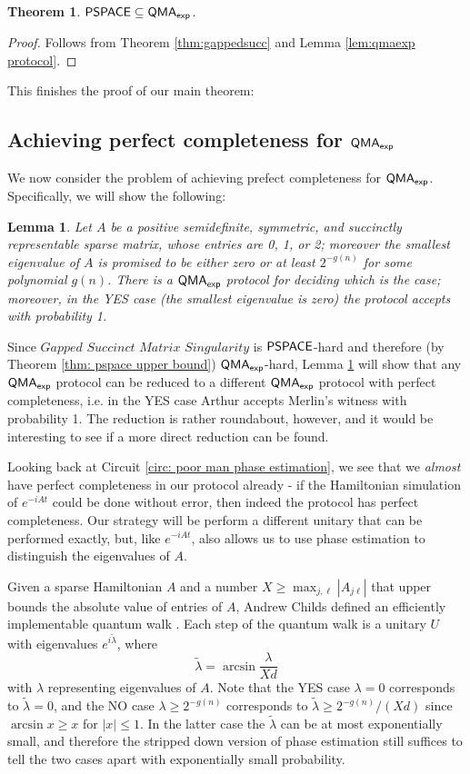 \documentclass[11pt]{article}
\newtheorem{theorem}{Theorem}
\newtheorem{lemma}{Lemma}
\theoremstyle{definition}
\theoremstyle{remark}
\newcommand\PSPACE{{\sf{PSPACE}}}
\newcommand\QMAexp{{\sf{QMA}_{exp}}}
\newcommand\gappedsucc{\textit{Gapped Succinct Matrix Singularity}}
\begin{document}
\begin{theorem}
$\PSPACE\subseteq\QMAexp$.
\end{theorem}
\begin{proof}
Follows from Theorem \ref{thm:gappedsucc} and Lemma \ref{lem:qmaexp protocol}.
\end{proof}
This finishes the proof of our main theorem:
\thmmain*
\subsection{Achieving perfect completeness for $\QMAexp$}
We now consider the problem of achieving prefect completeness for $\QMAexp$. Specifically, we will show the following:
\begin{lemma} \label{lem:qmaexp perfect completeness}
Let $A$ be a positive semidefinite, symmetric, and succinctly representable sparse matrix, whose entries are 0, 1, or 2; moreover the smallest eigenvalue of $A$ is promised to be either zero or at least $2^{-g(n)}$ for some polynomial $g(n)$. There is a $\QMAexp$ protocol for deciding which is the case; moreover, in the YES case (the smallest eigenvalue is zero) the protocol accepts with probability 1.
\end{lemma}
 Since $\gappedsucc$ is $\PSPACE$-hard and therefore (by Theorem \ref{thm: pspace upper bound}) $\QMAexp$-hard, Lemma \ref{lem:qmaexp perfect completeness} will show that any $\QMAexp$ protocol can be reduced to a different $\QMAexp$ protocol with perfect completeness, i.e. in the YES case Arthur accepts Merlin's witness with probability 1. The reduction is rather roundabout, however, and it would be interesting to see if a more direct reduction can be found.

Looking back at Circuit \ref{circ: poor man phase estimation}, we see that we \emph{almost} have perfect completeness in our protocol already - if the Hamiltonian simulation of $e^{-iAt}$ could be done without error, then indeed the protocol has perfect completeness. Our strategy will be perform a different unitary that can be performed exactly, but, like $e^{-iAt}$, also allows us to use phase estimation to distinguish the eigenvalues of $A$.

Given a sparse Hamiltonian $A$ and a number $X \ge \max_{j,\ell}|A_{j\ell}|$ that upper bounds the absolute value of entries of $A$, Andrew Childs defined an efficiently implementable quantum walk \cite{berry14,childs10}. Each step of the quantum walk is a unitary $U$ with eigenvalues $e^{i\tilde{\lambda}}$, where 
\begin{equation}
\tilde{\lambda} = \arcsin \frac{\lambda}{Xd}
\end{equation}
with $\lambda$ representing eigenvalues of $A$. Note that the YES case $\lambda = 0$ corresponds to $\tilde{\lambda}=0$, and the NO case $\lambda \ge 2^{-g(n)}$ corresponds to $\tilde{\lambda} \ge 2^{-g(n)}/(Xd)$ since $\arcsin x \ge x$ for $|x| \le 1$. In the latter case the $\tilde{\lambda}$ can be at most exponentially small, and therefore the stripped down version of phase estimation still suffices to tell the two cases apart with exponentially small probability.
\end{document}
